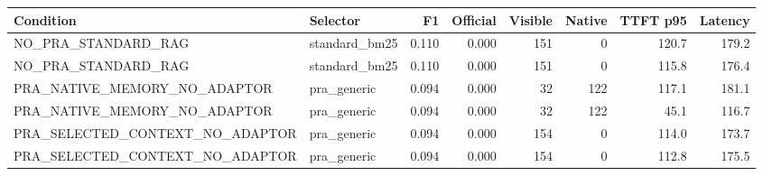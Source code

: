 \begin{tabular}{llrrrrrr}
\toprule
Condition & Selector & F1 & Official & Visible & Native & TTFT p95 & Latency \\
\midrule
NO\_PRA\_STANDARD\_RAG & standard\_bm25 & 0.110 & 0.000 & 151 & 0 & 120.7 & 179.2 \\
NO\_PRA\_STANDARD\_RAG & standard\_bm25 & 0.110 & 0.000 & 151 & 0 & 115.8 & 176.4 \\
PRA\_NATIVE\_MEMORY\_NO\_ADAPTOR & pra\_generic & 0.094 & 0.000 & 32 & 122 & 117.1 & 181.1 \\
PRA\_NATIVE\_MEMORY\_NO\_ADAPTOR & pra\_generic & 0.094 & 0.000 & 32 & 122 & 45.1 & 116.7 \\
PRA\_SELECTED\_CONTEXT\_NO\_ADAPTOR & pra\_generic & 0.094 & 0.000 & 154 & 0 & 114.0 & 173.7 \\
PRA\_SELECTED\_CONTEXT\_NO\_ADAPTOR & pra\_generic & 0.094 & 0.000 & 154 & 0 & 112.8 & 175.5 \\
\bottomrule
\end{tabular}
